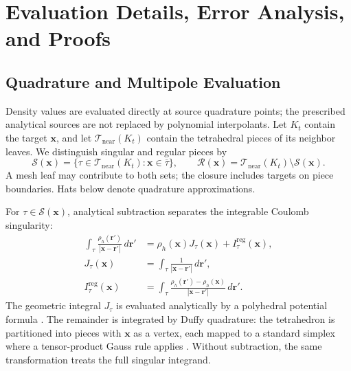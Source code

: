 \documentclass[a4paper,pdflatex,sn-mathphys-num]{sn-jnl}
\theoremstyle{thmstyleone}
\begin{document}
\appendix
\section{Evaluation Details, Error Analysis, and Proofs}
\label{app:theory}
\label{app:evaluation_validation}

\subsection{Quadrature and Multipole Evaluation}
\label{app:hartree_evaluation}

Density values are evaluated directly at source quadrature points; the prescribed analytical sources are not replaced by polynomial interpolants. Let $K_t$ contain the target $\mathbf x$, and let $\mathcal T_{\mathrm{near}}(K_t)$ contain the tetrahedral pieces of its neighbor leaves. We distinguish singular and regular pieces by
\begin{equation}
\mathcal S(\mathbf x)=
\{\tau\in\mathcal T_{\mathrm{near}}(K_t):\mathbf x\in\overline\tau\},
\qquad
\mathcal R(\mathbf x)=
\mathcal T_{\mathrm{near}}(K_t)\setminus\mathcal S(\mathbf x).
\label{eq:singular_set}
\end{equation}
A mesh leaf may contribute to both sets; the closure includes targets on piece boundaries. Hats below denote quadrature approximations.

For $\tau\in\mathcal S(\mathbf x)$, analytical subtraction separates the integrable Coulomb singularity:
\begin{equation}
\begin{aligned}
\int_\tau\frac{\rho_h(\mathbf r')}{|\mathbf x-\mathbf r'|}\,d\mathbf r'
&=\rho_h(\mathbf x)J_\tau(\mathbf x)+I_\tau^{\mathrm{reg}}(\mathbf x),\\
J_\tau(\mathbf x)&=\int_\tau\frac{1}{|\mathbf x-\mathbf r'|}\,d\mathbf r',\\
I_\tau^{\mathrm{reg}}(\mathbf x)&=\int_\tau
\frac{\rho_h(\mathbf r')-\rho_h(\mathbf x)}{|\mathbf x-\mathbf r'|}\,d\mathbf r'.
\end{aligned}
\label{eq:singular_split}
\end{equation}
The geometric integral $J_\tau$ is evaluated analytically by a polyhedral potential formula \cite{Werner1994}. The remainder is integrated by Duffy quadrature: the tetrahedron is partitioned into pieces with $\mathbf x$ as a vertex, each mapped to a standard simplex where a tensor-product Gauss rule applies \cite{Duffy1982}. Without subtraction, the same transformation treats the full singular integrand.
\end{document}
